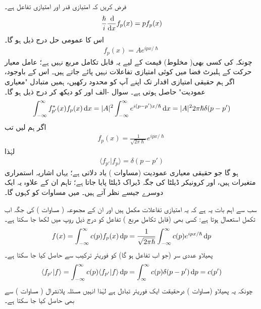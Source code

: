 \quad
فرض کریں کہ  امتیازی قدر اور  امتیازی تفاعل ہے۔
\begin{align}
\frac{\hslash}{i} \frac{\dif}{\dif x} f_{p}(x) = pf_{p}(x)
\end{align}
اس کا عمومی حل درج ذیل ہو گا۔
\begin{align*}
f_{p}(x) = Ae^{ipx/\hslash}
\end{align*}
چونکہ  کی کسی بھی( مخلوط)  قیمت کے لیے یہ قابل تکامل مربع نہیں ہے؛   عامل معیار حرکت  کے ہلبرٹ فضا میں کوئی امتیازی تفاعلات نہیں  پائے جاتے ہیں۔  اس کے باوجود،  اگر ہم حقیقی امتیازی اقدار تک اپنے آپ کو محدود رکھیں،  ہمیں متبادل "معیاری عمودیت" حاصل ہوتی ہے۔   سوال  -الف  اور   کو دیکھ کر درج ذیل ہو گا۔
\begin{align}
\int_{-\infty}^{\infty} f_{p'}^{*}(x)f_{p}(x) \dif x = |A|^{2}\int_{-\infty}^{\infty}e^{i(p-p')x/\hslash} \dif x = |A|^{2}2\pi\hslash\delta(p-p')
\end{align}
اگر ہم  لیں تب 
\begin{align}\label{مساوات_قواعد_امتیازی_تفاعل_معیار_حرکت}
f_{p}(x) = \frac{1}{\sqrt{2\pi\hslash}}e^{ipx/\hslash}
\end{align}
  لہٰذا 
\begin{align}\label{مساوات_قواعد_ڈیراک_معیاری_عمودیت}
\langle f_{p'} | f_{p} \rangle = \delta(p-p')
\end{align}
ہو گا جو حقیقی معیاری عمودیت (مساوات  )   یاد دلاتی  ہے؛   یہاں اشاریہ استمراری متغیرات ہیں،  اور کرونیکر ڈیلٹا کی جگہ ڈیراک ڈیلٹا پایا جاتا ہے؛   تاہم  ان  کے علاوہ یہ ایک دوسرے جیسے نظر آتے ہیں۔  میں مساوات  کو  کہوں گا۔  

سب سے اہم بات یہ ہے کہ یہ امتیازی تفاعلات مکمل ہیں اور ان کے مجموعہ ( مساوات ) کی جگہ اب تکمل استعمال ہوتا ہے:  کسی بھی (قابل تکامل مربع ) تفاعل  کو درج ذیل روپ میں لکھا جا سکتا ہے۔
\begin{align}\label{مساوات_قواعد_تفاعل_بطور_فوریئر_تکمل}
f(x) = \int_{-\infty}^{\infty} c(p)f_{p}(x)\dif p = \frac{1}{\sqrt{2\pi\hslash}}\int_{-\infty}^{\infty}c(p)e^{ipx/\hslash}\dif p
\end{align}
پھیلاو  عددی سر (جو اب  تفاعل   ہو گا)  کو فوریئر  ترکیب سے حاصل کیا جا سکتا ہے۔
\begin{align}
\langle f_{p'} | f \rangle = \int_{-\infty}^{\infty} c(p) \langle f_{p'} | f \rangle \dif p = \int_{\infty}^{\infty}c(p)\delta (p-p') \dif p = c(p')
\end{align}
چونکہ یہ پھیلاو (مساوات )   درحقیقت ایک  فوریئر تبادل ہے لہٰذا   انہیں مسئلہ پلانشرال ( مساوات )  سے بھی حاصل کیا جا سکتا ہے۔ 

